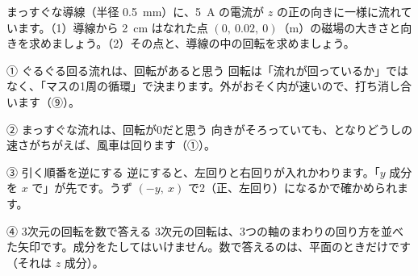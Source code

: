 \begin{jibun}
まっすぐな導線（半径 \qty{0.5}{mm}）に、\qty{5}{A} の電流が $z$ の正の向きに一様に流れています。（1）導線から \qty{2}{cm} はなれた点 $(0,\ 0.02,\ 0)$（m）の磁場の大きさと向きを求めましょう。（2）その点と、導線の中の回転を求めましょう。
\end{jibun}


\begin{tsumazuki}{① ぐるぐる回る流れは、回転があると思う}
回転は「流れが回っているか」ではなく、「マスの1周の循環」で決まります。外がおそく内が速いので、打ち消し合います（⑨）。
\end{tsumazuki}

\begin{tsumazuki}{② まっすぐな流れは、回転が0だと思う}
向きがそろっていても、となりどうしの速さがちがえば、風車は回ります（①）。
\end{tsumazuki}

\begin{tsumazuki}{③ 引く順番を逆にする}
逆にすると、左回りと右回りが入れかわります。「$y$ 成分を $x$ で」が先です。うず $(-y,\ x)$ で2（正、左回り）になるかで確かめられます。
\end{tsumazuki}

\begin{tsumazuki}{④ 3次元の回転を数で答える}
3次元の回転は、3つの軸のまわりの回り方を並べた矢印です。成分をたしてはいけません。数で答えるのは、平面のときだけです（それは $z$ 成分）。
\end{tsumazuki}

